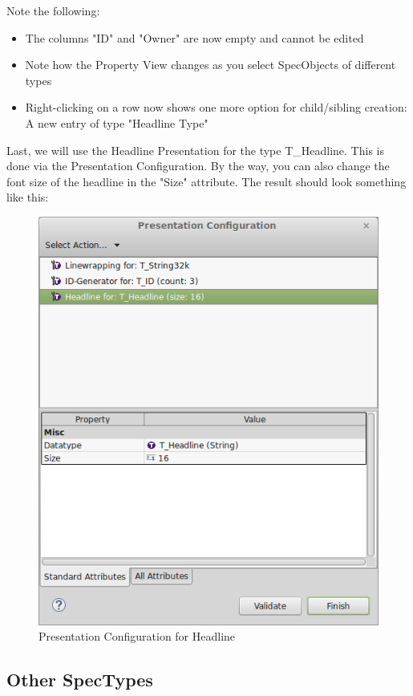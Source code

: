 Note the following:

\begin{itemize}
\item
  The columns "ID" and "Owner" are now empty and cannot be edited
\item
  Note how the Property View changes as you select SpecObjects of different types
\item
  Right-clicking on a row now shows one more option for child/sibling creation: A new entry of type "Headline Type"
\end{itemize}

Last, we will use the Headline Presentation for the type T\_Headline.  This is done via the Presentation Configuration.  By the way, you can also change the font size of the headline in the "Size" attribute.  The result should look something like this:

\begin{figure}[h!]
\centering      
\includegraphics[width=0.8\linewidth]{../rmf-images/Presentation_headline.png}      
\caption{Presentation Configuration for Headline}      
\label{fig:headlineConfig2}
\end{figure}

\subsection{Other SpecTypes}

